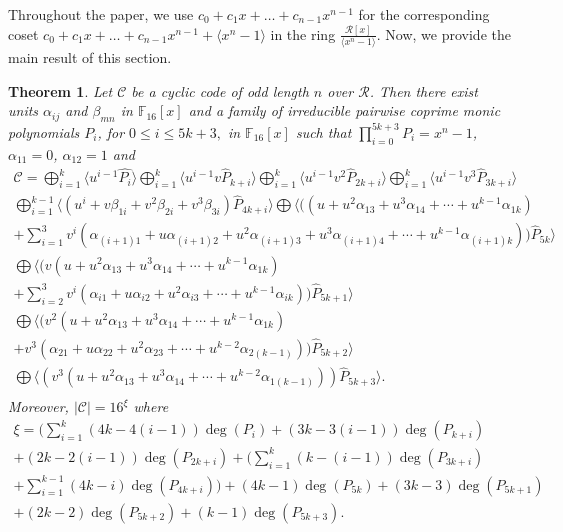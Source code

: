 \documentclass{amsart}
\newtheorem{theorem}{Theorem}[section]
\theoremstyle{definition}
\theoremstyle{remark}
\numberwithin{equation}{section}
\begin{document}
	Throughout the paper, we use $c_0+c_1x+\dots+c_{n-1}x^{n-1}$ for the corresponding      coset $c_0+c_1x+\dots+c_{n-1}x^{n-1}+\langle x^n-1\rangle$ in the ring                  $\frac{\mathcal{R}[x]}{\langle x^n-1\rangle}$. Now, we provide the main result of       this section.


	\begin{theorem}\label{th3}
		Let $\mathcal{C}$ be a cyclic code of odd length $n$ over $\mathcal{R}$. Then there exist units	$\alpha_{ij} $ and $\beta_{mn}$ in $\mathbb F_{16}[x]$ and a family of irreducible pairwise coprime monic polynomials $P_i$, for $0\leq i\leq 5k+3 ,$ in $\mathbb F_{16}[x]$ such that $\prod_{i=0}^{5k+3} P_i=x^n-1$, $\alpha_{11} = 0 $, $\alpha_{12} = 1 $ and 
  \allowdisplaybreaks\begin{gather*}
		\mathcal{C}= \bigoplus_{i=1}^{k}\langle u^{i-1}\hat{P_{i}}\rangle \bigoplus_{i=1}^{k}\langle u^{i-1}v\hat{P}_{k+i}\rangle \bigoplus_{i=1}^{k}\langle u^{i-1}v^2\hat{P}_{2k+i}\rangle  \bigoplus_{i=1}^{k}\langle u^{i-1}v^3\hat{P}_{3k+i}\rangle \\
        \bigoplus_{i=1}^{k-1} \langle (u^i+ v\beta_{1i} + v^2\beta_{2i} + v^3\beta_{3i})\hat{P}_{4k+i}\rangle   \bigoplus \langle ((u + u^2\alpha_{13} + u^3\alpha_{14} + \cdots + u^{k-1}\alpha_{1k}) \\
      + \sum_{i=1}^{3} v^i( \alpha_{(i+1)1} + u\alpha_{(i+1)2} + u^2\alpha_{(i+1)3} + u^3\alpha_{(i+1)4} + \cdots + u^{k-1}\alpha_{(i+1)k} ))\hat{P}_{5k}\rangle
     \\  \bigoplus  \langle (v(u + u^2\alpha_{13} + u^3\alpha_{14} + \cdots + u^{k-1}\alpha_{1k}) \\ + \sum_{i=2}^{3} v^i( \alpha_{i1} + u\alpha_{i2} + u^2\alpha_{i3} + \cdots + u^{k-1}\alpha_{ik} ))\hat{P}_{5k+1} \rangle
     \\  \bigoplus  \langle (v^2(u + u^2\alpha_{13} + u^3\alpha_{14} + \cdots + u^{k-1}\alpha_{1k})
     \\+ v^3( \alpha_{21} + u\alpha_{22} + u^2\alpha_{23} + \cdots + u^{k-2}\alpha_{2(k-1)}))\hat{P}_{5k+2}\rangle
     \\  \bigoplus \langle (v^3(u + u^2\alpha_{13} + u^3\alpha_{14} + \cdots + u^{k-2}\alpha_{1(k-1)}))\hat{P}_{5k+3}\rangle. \\
		\end{gather*}
    Moreover, $|\mathcal{C}|=16^{\xi}$ where
    \allowdisplaybreaks
    \begin{gather*}
    \xi = ( \sum_{i=1}^{k} (4k-4(i-1))\deg(P_i) + (3k-3(i-1))\deg(P_{k+i})  \\
     + (2k-2(i-1))\deg(P_{2k+i})  + ( \sum_{i=1}^{k} (k-(i-1))\deg(P_{3k+i})
    \\ + \sum_{i=1}^{k-1}(4k-i)\deg(P_{4k+i}) )
    + (4k-1)\deg(P_{5k}) + (3k-3)\deg(P_{5k+1}) \\ + (2k-2)\deg(P_{5k+2}) + (k-1)\deg(P_{5k+3}).\end{gather*}
  \end{theorem}
\end{document}
